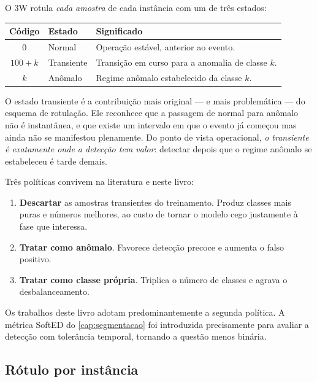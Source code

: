 O 3W rotula \emph{cada amostra} de cada instância com um de três estados:

\begin{center}
\small
\begin{tabular}{cll}
\toprule
\textbf{Código} & \textbf{Estado} & \textbf{Significado} \\
\midrule
$0$        & Normal    & Operação estável, anterior ao evento. \\
$100 + k$  & Transiente& Transição em curso para a anomalia de classe $k$. \\
$k$        & Anômalo   & Regime anômalo estabelecido da classe $k$. \\
\bottomrule
\end{tabular}
\end{center}

O estado transiente é a contribuição mais original --- e mais problemática --- do
esquema de rotulação. Ele reconhece que a passagem de normal para anômalo não é
instantânea, e que existe um intervalo em que o evento já começou mas ainda não se
manifestou plenamente. Do ponto de vista operacional, \emph{o transiente é exatamente
onde a detecção tem valor}: detectar depois que o regime anômalo se estabeleceu é tarde
demais.

\begin{destaque}
Três políticas convivem na literatura e neste livro:
\begin{enumerate}[leftmargin=*,itemsep=0.2em]
  \item \textbf{Descartar} as amostras transientes do treinamento. Produz classes mais
        puras e números melhores, ao custo de tornar o modelo cego justamente à fase
        que interessa.
  \item \textbf{Tratar como anômalo}. Favorece detecção precoce e aumenta o falso
        positivo.
  \item \textbf{Tratar como classe própria}. Triplica o número de classes e agrava o
        desbalanceamento.
\end{enumerate}
Os trabalhos deste livro adotam predominantemente a segunda política. A métrica SoftED
do \cref{cap:segmentacao} foi introduzida precisamente para avaliar a detecção com
tolerância temporal, tornando a questão menos binária.
\end{destaque}

\subsection{Rótulo por instância}

